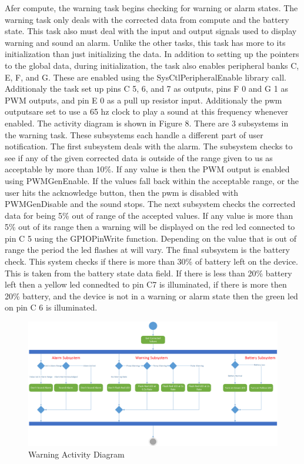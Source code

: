 \documentclass[12pt]{article} %
\begin{document}
Afer compute, the warning task begins checking for warning or alarm states. The warning task only deals with the corrected data from compute and the battery state. This task also must deal with the input and output signals used to display warning and sound an alarm. Unlike the other tasks, this task has more to its initialization than just initializing the data. In addition to setting up the pointers to the global data, during initialization, the task also enables peripheral banks C, E, F, and G. These are enabled using the SysCtlPeripheralEnable library call. Additionaly the task set up pins C 5, 6, and 7 as outputs, pins F 0 and G 1 as PWM outputs, and pin E 0 as a pull up resistor input. Additionaly the pwm outputsare set to use a 65 hz clock to play a sound at this frequency whenever enabled. The activity diagram is shown in Figure 8. There are 3 subsystems in the warning task. These subsystems each handle a different part of user notification. The first subsystem deals with the alarm. The subsystem checks to see if any of the given corrected data is outside of the range given to us as acceptable by more than 10\%. If any value is then the PWM output is enabled using PWMGenEnable. If the values fall back within the acceptable range, or the user hits the acknowledge button, then the pwm is disabled with PWMGenDisable and the sound stops. The next subsystem checks the corrected data for being 5\% out of range of the accepted values. If any value is more than 5\% out of its range then a warning will be displayed on the red led connected to pin C 5 using the GPIOPinWrite function. Depending on the value that is out of range the period the led flashes at will vary. The final subsystem is the battery check. This system checks if there is more than 30\% of battery left on the device. This is taken from the battery state data field. If there is less than 20\% battery left then a yellow led connedted to pin C7 is illuminated, if there is more then 20\% battery, and the device is not in a warning or alarm state then the green led on pin C 6 is illuminated. 

\begin{figure}
    \centering
    \includegraphics[width=\textwidth]{design/warning_activity.png}
    \caption{Warning Activity Diagram}
    \label{fig:Warning}
\end{figure}
\end{document}
